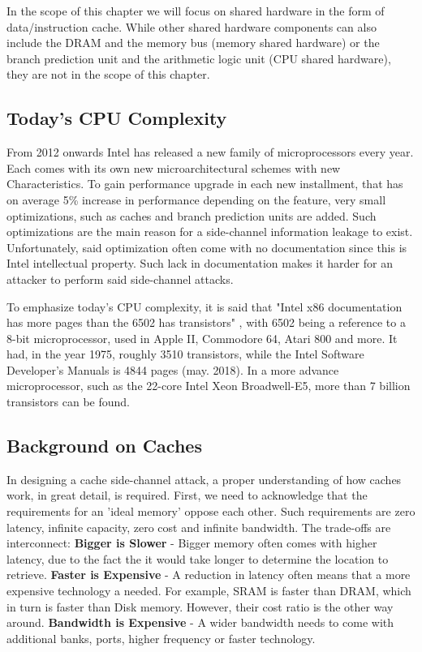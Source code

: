 In the scope of this chapter we will focus on shared hardware in the form of data/instruction cache. While other shared hardware components can also include the DRAM and the memory bus (memory shared hardware) or the branch prediction unit and the arithmetic logic unit (CPU shared hardware), they are not in the scope of this chapter.

\subsection{Today's CPU Complexity}
\label{subsec:todaycpucomplex}
From 2012 onwards Intel has released a new family of microprocessors every year. Each comes with its own new microarchitectural schemes with new Characteristics. To gain performance upgrade in each new installment, that has on average 5\% increase in performance depending on the feature, very small optimizations, such as caches and branch prediction units are added. Such optimizations are the main reason for a side-channel information leakage to exist. Unfortunately, said optimization often come with no documentation since this is Intel intellectual property. Such lack in documentation makes it harder for an attacker to perform said side-channel attacks.

To emphasize today's CPU complexity, it is said that "Intel x86 documentation has more pages than the 6502 has transistors" \cite{IntMan}, with 6502 being a reference to a 8-bit microprocessor, used in Apple II, Commodore 64, Atari 800 and more. It had, in the year 1975, roughly 3510 transistors, while the Intel Software Developer's Manuals is 4844 pages (may. 2018). In a more advance microprocessor, such as the 22-core Intel Xeon Broadwell-E5, more than 7 billion transistors can be found. 

\subsection{Background on Caches}
\label{subsec:backgroundoncaches}
In designing a cache side-channel attack, a proper understanding of how caches work, in great detail, is required. First, we need to acknowledge that the requirements for an 'ideal memory' oppose each other. Such requirements are zero latency, infinite capacity, zero cost and infinite bandwidth. The trade-offs are interconnect: \textbf{Bigger is Slower} - Bigger memory often comes with higher latency, due to the fact the it would take longer to determine the location to retrieve.  \textbf{Faster is Expensive} - A reduction in latency often means that a more expensive technology a needed. For example, SRAM is faster than DRAM, which in turn is faster than Disk memory. However, their cost ratio is the other way around. \textbf{Bandwidth is Expensive} - A wider bandwidth needs to come with additional banks, ports, higher frequency or faster technology. 

